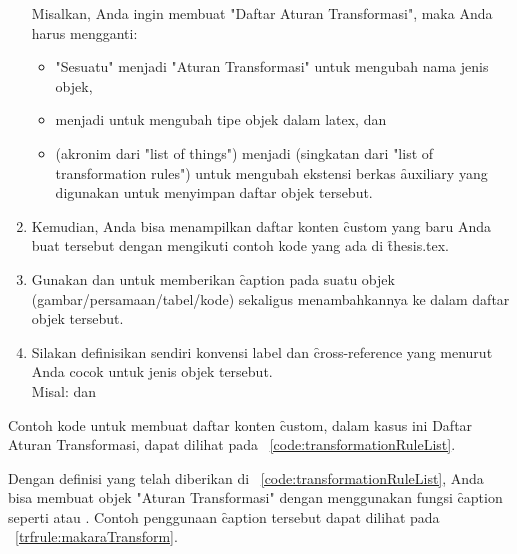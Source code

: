 \begin{enumerate}
	Misalkan, Anda ingin membuat "Daftar Aturan Transformasi", maka Anda harus mengganti:
	\begin{itemize}
		\item "Sesuatu" menjadi "Aturan Transformasi" untuk mengubah nama jenis objek,
		\item {} menjadi  untuk mengubah tipe objek dalam \gls{latex}, dan
		\item {} (akronim dari "list of things") menjadi  (singkatan dari "list of transformation rules") untuk mengubah ekstensi berkas \f{auxiliary} yang digunakan untuk menyimpan daftar objek tersebut.
	\end{itemize}
	\item Kemudian, Anda bisa menampilkan daftar konten \f{custom} yang baru Anda buat tersebut dengan mengikuti contoh kode yang ada di \f{thesis.tex}.
	\item Gunakan  dan  untuk memberikan \f{caption} pada suatu objek (gambar/persamaan/tabel/kode) sekaligus menambahkannya ke dalam daftar objek tersebut.
	\item Silakan definisikan sendiri konvensi label dan \f{cross-reference} yang menurut Anda cocok untuk jenis objek tersebut. \\
		Misal:  dan 
\end{enumerate}

Contoh kode untuk membuat daftar konten \f{custom}, dalam kasus ini Daftar Aturan Transformasi,
dapat dilihat pada \lst~\ref{code:transformationRuleList}.





Dengan definisi yang telah diberikan di \lst~\ref{code:transformationRuleList}, Anda bisa membuat objek "Aturan Transformasi" dengan menggunakan fungsi \f{caption}
seperti  atau .
Contoh penggunaan \f{caption} tersebut dapat dilihat pada \transformationrule~\ref{trfrule:makaraTransform}.

